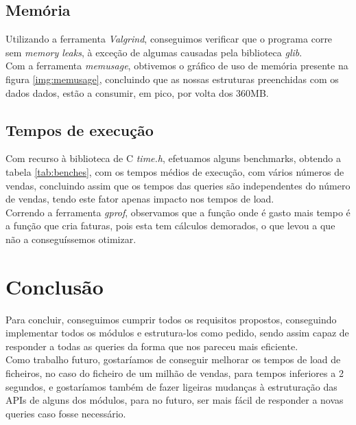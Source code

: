 \documentclass[a4paper]{report}
\begin{document}
\section{Memória}

Utilizando a ferramenta \textit{Valgrind}, conseguimos verificar que o programa
corre sem \textit{memory leaks}, à exceção de algumas causadas pela biblioteca
\textit{glib}.\\

Com a ferramenta \textit{memusage}, obtivemos o gráfico de uso de memória presente
na figura \ref{img:memusage}, concluindo que as nossas estruturas preenchidas com
os dados dados, estão a consumir, em pico, por volta dos 360MB.

\section{Tempos de execução}

Com recurso à biblioteca de C \textit{time.h}, efetuamos alguns benchmarks, obtendo
a tabela \ref{tab:benches}, com os tempos médios de execução, com vários números 
de vendas, concluindo assim que os tempos das queries são independentes do número de 
vendas, tendo este fator apenas impacto nos tempos de load.
\\
Correndo a ferramenta \textit{gprof}, observamos que a função onde é gasto mais tempo
é a função que cria faturas, pois esta tem cálculos demorados, o que levou a que não 
a conseguíssemos otimizar.

\chapter{Conclusão}

Para concluir, conseguimos cumprir todos os requisitos propostos, conseguindo implementar
todos os módulos e estrutura-los como pedido, sendo assim capaz de responder a todas as 
queries da forma que nos pareceu mais eficiente.\\
Como trabalho futuro, gostaríamos de conseguir melhorar os tempos de load de ficheiros,
no caso do ficheiro de um milhão de vendas, para tempos inferiores a 2 segundos, e
gostaríamos também de fazer ligeiras mudanças à estruturação das APIs de alguns dos 
módulos, para no futuro, ser mais fácil de responder a novas queries caso fosse 
necessário.

\appendix
\end{document}
